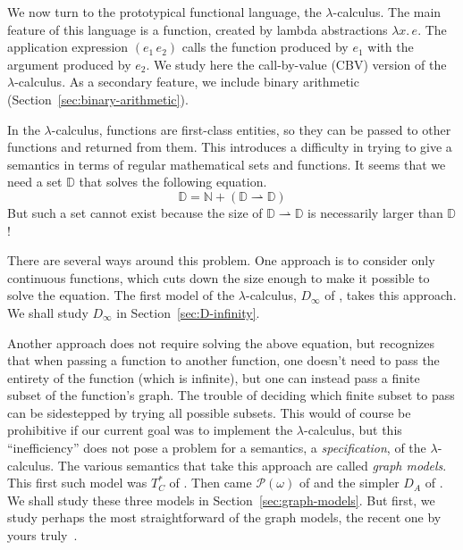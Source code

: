 \documentclass{tufte-handout}
\newcommand{\LAM}[1]{\lambda #1.\,}
\newcommand{\pto}[0]{\rightharpoonup}
\begin{document}
We now turn to the prototypical functional language, the
$\lambda$-calculus. The main feature of this language is a function,
created by lambda abstractions $\LAM{x}e$. The application expression
$(e_1\,e_2)$ calls the function produced by $e_1$ with the argument
produced by $e_2$. We study here the call-by-value (CBV) version of
the $\lambda$-calculus.  As a secondary feature, we include binary
arithmetic (Section~\ref{sec:binary-arithmetic}).

In the $\lambda$-calculus, functions are first-class entities, so they
can be passed to other functions and returned from them. This
introduces a difficulty in trying to give a semantics in terms of
regular mathematical sets and functions. It seems that we need a set
$\mathbb{D}$ that solves the following equation.
\[
   \mathbb{D} = \mathbb{N} + (\mathbb{D} \pto \mathbb{D})
\]
But such a set cannot exist because the size of $\mathbb{D} \pto
\mathbb{D}$ is necessarily larger than $\mathbb{D}$!

There are several ways around this problem. One approach is to
consider only continuous functions, which cuts down the size enough to
make it possible to solve the equation. The first model of the
$\lambda$-calculus, $D_\infty$ of \citet{Scott:1970dp}, takes this
approach. We shall study $D_\infty$ in Section~\ref{sec:D-infinity}.

Another approach does not require solving the above equation, but
recognizes that when passing a function to another function, one
doesn't need to pass the entirety of the function (which is infinite),
but one can instead pass a finite subset of the function's graph.  The
trouble of deciding which finite subset to pass can be sidestepped by
trying all possible subsets. This would of course be prohibitive if
our current goal was to implement the $\lambda$-calculus, but this
``inefficiency'' does not pose a problem for a semantics, a
\emph{specification}, of the $\lambda$-calculus. The various semantics
that take this approach are called \emph{graph models}. This first
such model was $T^{*}_C$ of \citet{Plotkin:1972aa}. Then came
$\mathcal{P}(\omega)$ of \citet{Scott:1976lq} and the simpler $D_A$ of
\citet{Engeler:1981aa}. We shall study these three models in
Section~\ref{sec:graph-models}. But first, we study perhaps the most
straightforward of the graph models, the recent one by yours
truly~\citep{Siek:2017ab}.
\end{document}
